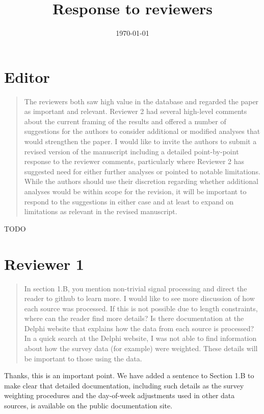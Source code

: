 \documentclass[11pt]{article}
\title{Response to reviewers}
\author{}
\date{\today}
\begin{document}
\maketitle

\section*{Editor}

\begin{quote}
  The reviewers both saw high value in the database and regarded the paper as
  important and relevant. Reviewer 2 had several high-level comments about the
  current framing of the results and offered a number of suggestions for the
  authors to consider additional or modified analyses that would strengthen the
  paper. I would like to invite the authors to submit a revised version of the
  manuscript including a detailed point-by-point response to the reviewer
  comments, particularly where Reviewer 2 has suggested need for either further
  analyses or pointed to notable limitations. While the authors should use their
  discretion regarding whether additional analyses would be within scope for the
  revision, it will be important to respond to the suggestions in either case
  and at least to expand on limitations as relevant in the revised manuscript.
\end{quote}

TODO

\section*{Reviewer 1}

\begin{quote}
  In section 1.B, you mention non-trivial signal processing and direct the
  reader to github to learn more. I would like to see more discussion of how
  each source was processed. If this is not possible due to length constraints,
  where can the reader find more details? Is there documentation at the Delphi
  website that explains how the data from each source is processed? In a quick
  search at the Delphi website, I was not able to find information about how the
  survey data (for example) were weighted. These details will be important to
  those using the data.
\end{quote}

Thanks, this is an important point. We have added a sentence to Section 1.B to
make clear that detailed documentation, including such details as the survey
weighting procedures and the day-of-week adjustments used in other data sources,
is available on the public documentation site.
\end{document}
